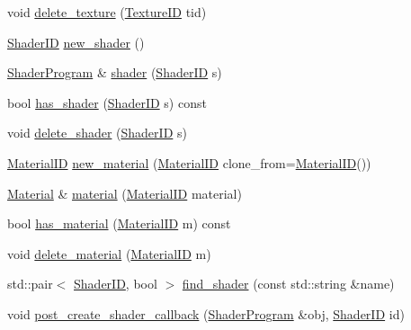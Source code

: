 \begin{DoxyCompactItemize}
void \hyperlink{classkglt_1_1_resource_manager_aa3911de4bbf032f0d6ddf160f3802b72}{delete\-\_\-texture} (\hyperlink{namespacekglt_aaea040f25edb7f75ca0f3aa8136a45a1}{Texture\-I\-D} tid)
\item 
\hyperlink{namespacekglt_a2aafe4bf33d26659020117cad360422f}{Shader\-I\-D} \hyperlink{classkglt_1_1_resource_manager_aea6e0a80923da056326a7aa5993f5b87}{new\-\_\-shader} ()
\item 
\hyperlink{classkglt_1_1_shader_program}{Shader\-Program} \& \hyperlink{classkglt_1_1_resource_manager_a1ff7b102fc62c520ee4fe37ea47aab57}{shader} (\hyperlink{namespacekglt_a2aafe4bf33d26659020117cad360422f}{Shader\-I\-D} s)
\item 
bool \hyperlink{classkglt_1_1_resource_manager_a68c0c9ca9c2023be7a342e9af81ad45a}{has\-\_\-shader} (\hyperlink{namespacekglt_a2aafe4bf33d26659020117cad360422f}{Shader\-I\-D} s) const 
\item 
void \hyperlink{classkglt_1_1_resource_manager_a4514c9abd5eb2c3f7a093c498f477b39}{delete\-\_\-shader} (\hyperlink{namespacekglt_a2aafe4bf33d26659020117cad360422f}{Shader\-I\-D} s)
\item 
\hyperlink{namespacekglt_a5ffac6377a7d3e163b4d5c31f71db43a}{Material\-I\-D} \hyperlink{classkglt_1_1_resource_manager_a95ed79a3a1a4bf8ce94a2f90a390b71b}{new\-\_\-material} (\hyperlink{namespacekglt_a5ffac6377a7d3e163b4d5c31f71db43a}{Material\-I\-D} clone\-\_\-from=\hyperlink{namespacekglt_a5ffac6377a7d3e163b4d5c31f71db43a}{Material\-I\-D}())
\item 
\hyperlink{classkglt_1_1_material}{Material} \& \hyperlink{classkglt_1_1_resource_manager_a9a04e6706b7566fc5b9a61b5c2df75b8}{material} (\hyperlink{namespacekglt_a5ffac6377a7d3e163b4d5c31f71db43a}{Material\-I\-D} material)
\item 
bool \hyperlink{classkglt_1_1_resource_manager_a611069d4720d788a0d0e5c27411b8f91}{has\-\_\-material} (\hyperlink{namespacekglt_a5ffac6377a7d3e163b4d5c31f71db43a}{Material\-I\-D} m) const 
\item 
void \hyperlink{classkglt_1_1_resource_manager_a1f9749925a496123863a1994a358c1f0}{delete\-\_\-material} (\hyperlink{namespacekglt_a5ffac6377a7d3e163b4d5c31f71db43a}{Material\-I\-D} m)
\item 
std\-::pair$<$ \hyperlink{namespacekglt_a2aafe4bf33d26659020117cad360422f}{Shader\-I\-D}, bool $>$ \hyperlink{classkglt_1_1_resource_manager_ae76bbc326367c7e6482f751ee135f065}{find\-\_\-shader} (const std\-::string \&name)
\item 
void \hyperlink{classkglt_1_1_resource_manager_a2470daed90e89907e3ec5ed6f4d03243}{post\-\_\-create\-\_\-shader\-\_\-callback} (\hyperlink{classkglt_1_1_shader_program}{Shader\-Program} \&obj, \hyperlink{namespacekglt_a2aafe4bf33d26659020117cad360422f}{Shader\-I\-D} id)

\end{DoxyCompactItemize}

